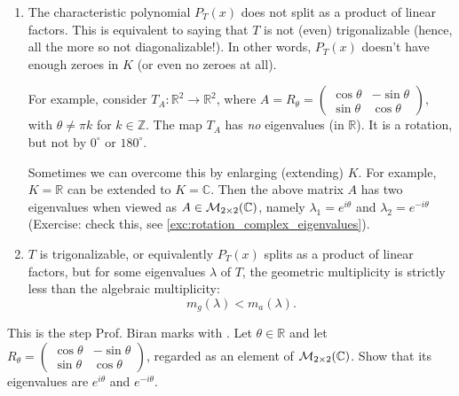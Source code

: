 \begin{enumerate}[label=\textbf{(\alph*)}]
    \item The characteristic polynomial $P_T(x)$ does not split as a product of linear factors. This is equivalent to saying that $T$ is not (even) trigonalizable (hence, all the more so not diagonalizable!). In other words, $P_T(x)$ doesn't have enough zeroes in $K$ (or even no zeroes at all).
    
    For example, consider $T_A \colon \mathbb{R}^2 \to \mathbb{R}^2$, where $A = R_\theta = \left(\begin{smallmatrix} \cos\theta & -\sin\theta \\ \sin\theta & \cos\theta \end{smallmatrix}\right)$, with $\theta \neq \pi k$ for $k \in \mathbb{Z}$. The map $T_A$ has \emph{no} eigenvalues (in $\mathbb{R}$). It is a rotation, but not by $0^\circ$ or $180^\circ$.
    
    Sometimes we can overcome this  by enlarging (extending) $K$. For example, $K = \mathbb{R}$ can be extended to $K = \mathbb{C}$. Then the above matrix $A$ has two eigenvalues when viewed as $A \in \mathcal{M}_{2 \times 2}(\mathbb{C})$, namely $\lambda_1 = e^{i\theta}$ and $\lambda_2 = e^{-i\theta}$ (Exercise: check this, see \cref{exc:rotation_complex_eigenvalues}).

    \item $T$ is trigonalizable, or equivalently $P_T(x)$ splits as a product of linear factors, but for some eigenvalues $\lambda$ of $T$, the geometric multiplicity is strictly less than the algebraic multiplicity:
    \[
    m_g(\lambda) < m_a(\lambda).
    \]
\end{enumerate}

\begin{exercise}
\label{exc:rotation_complex_eigenvalues}
This is the step Prof. Biran marks with . Let $\theta \in \mathbb{R}$ and let $R_\theta = \left(\begin{smallmatrix} \cos\theta & -\sin\theta \\ \sin\theta & \cos\theta \end{smallmatrix}\right)$, regarded as an element of $\mathcal{M}_{2 \times 2}(\mathbb{C})$. Show that its eigenvalues are $e^{i\theta}$ and $e^{-i\theta}$.
\end{exercise}

